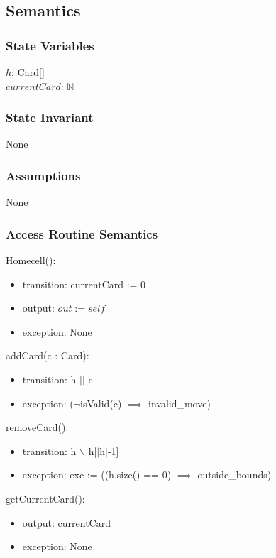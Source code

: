 \documentclass[12pt]{article}
\begin{document}
\subsection* {Semantics}

\subsubsection* {State Variables}

$h$: Card[]\\
$currentCard$: $\mathbb{N}$

\subsubsection* {State Invariant}

None

\subsubsection* {Assumptions}

None

\subsubsection* {Access Routine Semantics}

Homecell():
\begin{itemize}
	\item transition: currentCard := 0
	\item output: $out := \mathit{self}$
	\item exception: None
\end{itemize}

\noindent addCard(c : Card):
\begin{itemize}
	\item transition: h $||$ c
	\item exception: ($\lnot$isValid(c) $\implies$ invalid\_move)
\end{itemize}

\noindent removeCard():
\begin{itemize}
	\item transition: h $\backslash$ h[$|$h$|$-1]
	\item exception: exc := ((h.size() == 0) $\implies$ outside\_bounds)
\end{itemize}

\noindent getCurrentCard():
\begin{itemize}
	\item output: currentCard
	\item exception: None
\end{itemize}
\end{document}
